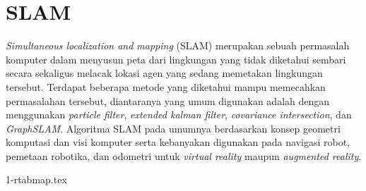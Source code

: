\section{SLAM}
\label{sec:slam}

\emph{Simultaneous localization and mapping} (SLAM) merupakan sebuah permasalah komputer dalam menyusun peta dari lingkungan yang tidak diketahui sembari secara sekaligus melacak lokasi agen yang sedang memetakan lingkungan tersebut.
Terdapat beberapa metode yang diketahui mampu memecahkan permasalahan tersebut,
  diantaranya yang umum digunakan adalah dengan menggunakan \emph{particle filter}, \emph{extended kalman filter}, \emph{covariance intersection}, dan \emph{GraphSLAM}.
Algoritma SLAM pada umumnya berdasarkan konsep geometri komputasi dan visi komputer serta kebanyakan digunakan pada navigasi robot,
  pemetaan robotika, dan odometri untuk \emph{virtual reality} maupun \emph{augmented reality}.

{1-rtabmap.tex}
